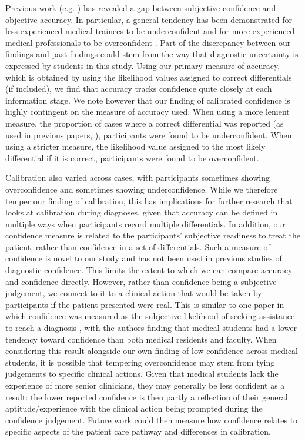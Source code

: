 \documentclass[a4paper, nobind]{templates/ociamthesis}
\begin{document}
Previous work (e.g. \textcite{meyer_physicians_2013}) has revealed a gap between subjective confidence and objective accuracy. In particular, a general tendency has been demonstrated for less experienced medical trainees to be underconfident and for more experienced medical professionals to be overconfident \autocite{yang_nurses_2010}. Part of the discrepancy between our findings and past findings could stem from the way that diagnostic uncertainty is expressed by students in this study. Using our primary measure of accuracy, which is obtained by using the likelihood values assigned to correct differentials (if included), we find that accuracy tracks confidence quite closely at each information stage. We note however that our finding of calibrated confidence is highly contingent on the measure of accuracy used. When using a more lenient measure, the proportion of cases where a correct differential was reported (as used in previous papers, \autocite{friedman_physicians_2005,meyer_physicians_2013,lambe_guided_2018,kuper_mitigating_2024}), participants were found to be underconfident. When using a stricter measure, the likelihood value assigned to the most likely differential if it is correct, participants were found to be overconfident.

\hfill\break
Calibration also varied across cases, with participants sometimes showing overconfidence and sometimes showing underconfidence. While we therefore temper our finding of calibration, this has implications for further research that looks at calibration during diagnoses, given that accuracy can be defined in multiple ways when participants record multiple differentials. In addition, our confidence measure is related to the participants' subjective readiness to treat the patient, rather than confidence in a set of differentials. Such a measure of confidence is novel to our study and has not been used in previous studies of diagnostic confidence. This limits the extent to which we can compare accuracy and confidence directly. However, rather than confidence being a subjective judgement, we connect to it to a clinical action that would be taken by participants if the patient presented were real. This is similar to one paper in which confidence was measured as the subjective likelihood of seeking assistance to reach a diagnosis \autocite{friedman_physicians_2005}, with the authors finding that medical students had a lower tendency toward confidence than both medical residents and faculty. When considering this result alongside our own finding of low confidence across medical students, it is possible that tempering overconfidence may stem from tying judgements to specific clinical actions. Given that medical students lack the experience of more senior clinicians, they may generally be less confident as a result: the lower reported confidence is then partly a reflection of their general aptitude/experience with the clinical action being prompted during the confidence judgement. Future work could then measure how confidence relates to specific aspects of the patient care pathway and differences in calibration.\\
\end{document}
